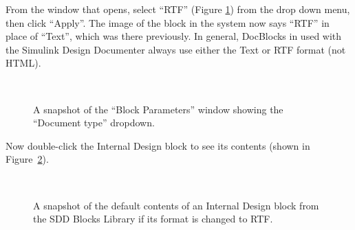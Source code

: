 \documentclass{mcscert}
\newcommand{\sddtool}{Simulink Design Documenter}
\newcommand{\sddblks}{SDD Blocks Library}
\begin{document}
From the window that opens, select ``RTF'' (Figure \ref{fig:mask-param}) from the drop down menu, then click ``Apply''. 
The image of the block in the system now says ``RTF'' in place of ``Text'', which was there previously. 
In general, DocBlocks in used with the \sddtool{} always use either the Text or RTF format (not HTML).

\begin{figure}
	\caption{A snapshot of the ``Block Parameters'' window showing the ``Document	type'' dropdown.}
	\centering
	\label{fig:mask-param}
	\\
\end{figure}

Now double-click the Internal Design block to see its contents (shown in Figure~\ref{fig:int-des-rtf}).

\begin{figure}
	\caption{A snapshot of the default contents of an Internal Design block from the \sddblks{} if its format is changed to RTF.}
	\centering
	\label{fig:int-des-rtf}
	\\
\end{figure}
\end{document}
